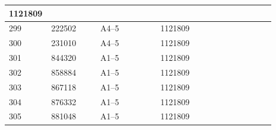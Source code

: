 \documentclass[UTF8,10pt,a4paper,fontset=fandol]{ctexart}
\newcommand{\fieldvalue}[1]{#1}
\begin{document}
\begin{center}
\begin{tabular}{|p{0.07\linewidth}|p{0.18\linewidth}|p{0.22\linewidth}|p{0.22\linewidth}|p{0.20\linewidth}|}
\fieldvalue{1121809} & \\ \hline
\fieldvalue{299} &
\fieldvalue{222502} &
\fieldvalue{A4--5} &
\fieldvalue{1121809} & \\ \hline
\fieldvalue{300} &
\fieldvalue{231010} &
\fieldvalue{A4--5} &
\fieldvalue{1121809} & \\ \hline
\fieldvalue{301} &
\fieldvalue{844320} &
\fieldvalue{A1--5} &
\fieldvalue{1121809} & \\ \hline
\fieldvalue{302} &
\fieldvalue{858884} &
\fieldvalue{A1--5} &
\fieldvalue{1121809} & \\ \hline
\fieldvalue{303} &
\fieldvalue{867118} &
\fieldvalue{A1--5} &
\fieldvalue{1121809} & \\ \hline
\fieldvalue{304} &
\fieldvalue{876332} &
\fieldvalue{A1--5} &
\fieldvalue{1121809} & \\ \hline
\fieldvalue{305} &
\fieldvalue{881048} &
\fieldvalue{A1--5} &
\fieldvalue{1121809} & \\ \hline

\end{tabular}
\end{center}
\end{document}
